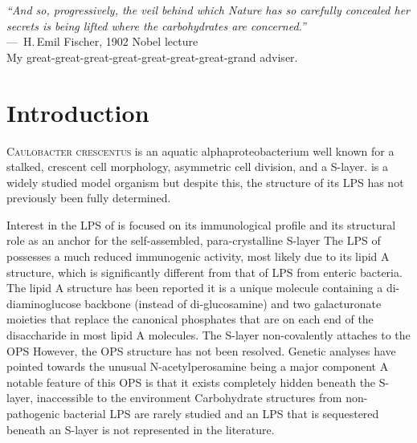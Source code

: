 \acresetall
{}

\begin{epigraph}
  \emph{``And so, progressively, the veil behind which Nature has so carefully concealed her secrets
is being lifted where the carbohydrates are concerned.''} \\---~H.\,Emil Fischer, 1902 Nobel
  lecture\\ My great-great-great-great-great-great-great-grand adviser.
\end{epigraph}
\section{Introduction} %
\label{sec:lps_introduction} 
\lettrine[lines=2]{C}{aulobacter crescentus}  is an aquatic alphaproteobacterium
well known for a stalked, crescent cell morphology, asymmetric cell division, and a
\ac{S-layer}. \caulobacter is a widely studied model organism but despite this, the structure of its \ac{LPS} has not previously been fully
determined.

Interest in the \ac{LPS} of \caulobacter is focused on its immunological
profile and its structural role as an anchor for the
self-assembled, para-crystalline \ac{S-layer} The \ac{LPS}
of \caulobacter possesses a much reduced immunogenic activity, most likely due
to its lipid A structure, which is significantly different from that of
\ac{LPS} from enteric bacteria. The lipid A structure has been
reported it is a unique molecule containing a
di-diaminoglucose backbone (instead of di-glucosamine) and two galacturonate
moieties that replace the canonical phosphates that are on each end of the
disaccharide in most lipid A molecules. The \caulobacter \ac{S-layer}
non-covalently attaches to the \ac{OPS} However, the
\ac{OPS} structure has not been resolved. Genetic analyses have pointed
towards the unusual N-acetylperosamine being a major
component A notable feature of this \ac{OPS} is that it
exists completely hidden beneath the \ac{S-layer}, inaccessible to the
environment Carbohydrate structures from non-pathogenic
bacterial \ac{LPS} are rarely studied and an \ac{LPS} that is sequestered
beneath an \ac{S-layer} is not represented in the literature.
 

